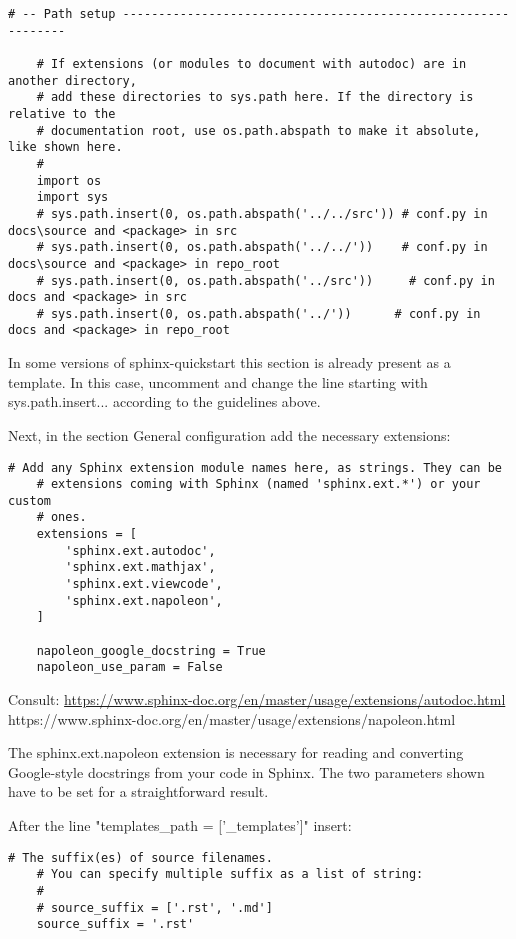 \begin{lstlisting}[style=DOS]
	# -- Path setup --------------------------------------------------------------
	
	# If extensions (or modules to document with autodoc) are in another directory,
	# add these directories to sys.path here. If the directory is relative to the
	# documentation root, use os.path.abspath to make it absolute, like shown here.
	#
	import os
	import sys
	# sys.path.insert(0, os.path.abspath('../../src')) # conf.py in docs\source and <package> in src
	# sys.path.insert(0, os.path.abspath('../../'))    # conf.py in docs\source and <package> in repo_root
	# sys.path.insert(0, os.path.abspath('../src'))     # conf.py in docs and <package> in src
    # sys.path.insert(0, os.path.abspath('../'))      # conf.py in docs and <package> in repo_root
\end{lstlisting}

In some versions of \textsf{sphinx-quickstart} this section is already present as a template. In this case, uncomment and change the line starting with \textsf{sys.path.insert...} according to the guidelines above.

Next, in the section \textsf{General configuration} add the necessary extensions:

\begin{lstlisting}[style=DOS]
    # Add any Sphinx extension module names here, as strings. They can be
    # extensions coming with Sphinx (named 'sphinx.ext.*') or your custom
    # ones.
    extensions = [
        'sphinx.ext.autodoc',
        'sphinx.ext.mathjax',
        'sphinx.ext.viewcode',
        'sphinx.ext.napoleon',
    ]
    
    napoleon_google_docstring = True
    napoleon_use_param = False
\end{lstlisting}

Consult: 
\url{https://www.sphinx-doc.org/en/master/usage/extensions/autodoc.html} \\
https://www.sphinx-doc.org/en/master/usage/extensions/napoleon.html

The \textsf{sphinx.ext.napoleon} extension is necessary for reading and converting Google-style docstrings from your code in \textsf{Sphinx}. The two parameters shown have to be set for a straightforward result.

After the line "templates\_path = ['\_templates']" insert:
\begin{lstlisting}[style=DOS]
    # The suffix(es) of source filenames.
    # You can specify multiple suffix as a list of string:
    #
    # source_suffix = ['.rst', '.md']
    source_suffix = '.rst'
\end{lstlisting}

